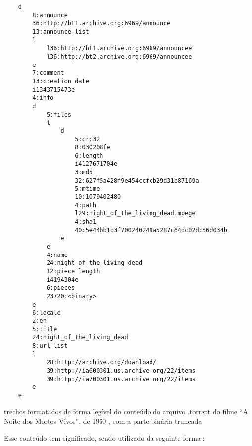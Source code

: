 \begin{listing}[ht!]
    \begin{verbatim}
    d
        8:announce
        36:http://bt1.archive.org:6969/announce
        13:announce-list
        l
            l36:http://bt1.archive.org:6969/announcee
            l36:http://bt2.archive.org:6969/announcee
        e
        7:comment
        13:creation date
        i1343715473e
        4:info
        d
            5:files
            l
                d
                    5:crc32
                    8:030208fe
                    6:length
                    i4127671704e
                    3:md5
                    32:627f5a428f9e454ccfcb29d31b87169a
                    5:mtime
                    10:1079402480
                    4:path
                    l29:night_of_the_living_dead.mpege
                    4:sha1
                    40:5e44bb1b3f700240249a5287c64dc02dc56d034b
                e
            e
            4:name
            24:night_of_the_living_dead
            12:piece length
            i4194304e
            6:pieces
            23720:<binary>
        e
        6:locale
        2:en
        5:title
        24:night_of_the_living_dead
        8:url-list
        l
            28:http://archive.org/download/
            39:http://ia600301.us.archive.org/22/items
            39:http://ia700301.us.archive.org/22/items
        e
    e
    \end{verbatim}
    \caption{trechos formatados de forma legível do conteúdo do arquivo .torrent do
    filme ``A Noite dos Mortos Vivos'', de 1960 \cite{torrent-file}, com a parte
    binária truncada}
    \label{lst:torrent-file-code}
\end{listing}

\newpage

Esse conteúdo tem significado, sendo utilizado da seguinte forma
\cite{site:torrent-spec-wiki}:

